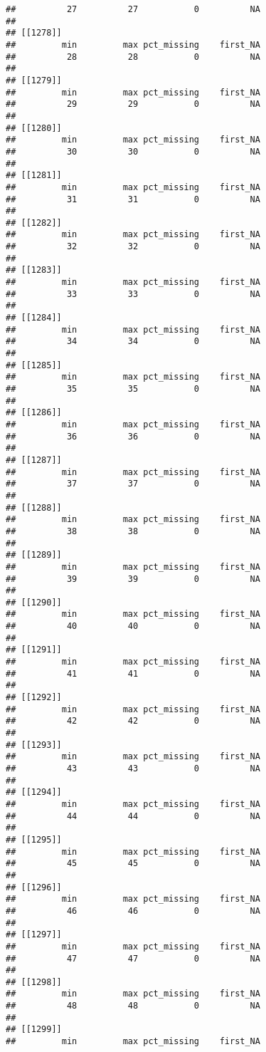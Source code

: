 \documentclass[
]{article}
\begin{document}
\begin{verbatim}
##          27          27           0          NA 
## 
## [[1278]]
##         min         max pct_missing    first_NA 
##          28          28           0          NA 
## 
## [[1279]]
##         min         max pct_missing    first_NA 
##          29          29           0          NA 
## 
## [[1280]]
##         min         max pct_missing    first_NA 
##          30          30           0          NA 
## 
## [[1281]]
##         min         max pct_missing    first_NA 
##          31          31           0          NA 
## 
## [[1282]]
##         min         max pct_missing    first_NA 
##          32          32           0          NA 
## 
## [[1283]]
##         min         max pct_missing    first_NA 
##          33          33           0          NA 
## 
## [[1284]]
##         min         max pct_missing    first_NA 
##          34          34           0          NA 
## 
## [[1285]]
##         min         max pct_missing    first_NA 
##          35          35           0          NA 
## 
## [[1286]]
##         min         max pct_missing    first_NA 
##          36          36           0          NA 
## 
## [[1287]]
##         min         max pct_missing    first_NA 
##          37          37           0          NA 
## 
## [[1288]]
##         min         max pct_missing    first_NA 
##          38          38           0          NA 
## 
## [[1289]]
##         min         max pct_missing    first_NA 
##          39          39           0          NA 
## 
## [[1290]]
##         min         max pct_missing    first_NA 
##          40          40           0          NA 
## 
## [[1291]]
##         min         max pct_missing    first_NA 
##          41          41           0          NA 
## 
## [[1292]]
##         min         max pct_missing    first_NA 
##          42          42           0          NA 
## 
## [[1293]]
##         min         max pct_missing    first_NA 
##          43          43           0          NA 
## 
## [[1294]]
##         min         max pct_missing    first_NA 
##          44          44           0          NA 
## 
## [[1295]]
##         min         max pct_missing    first_NA 
##          45          45           0          NA 
## 
## [[1296]]
##         min         max pct_missing    first_NA 
##          46          46           0          NA 
## 
## [[1297]]
##         min         max pct_missing    first_NA 
##          47          47           0          NA 
## 
## [[1298]]
##         min         max pct_missing    first_NA 
##          48          48           0          NA 
## 
## [[1299]]
##         min         max pct_missing    first_NA 

\end{verbatim}
\end{document}
